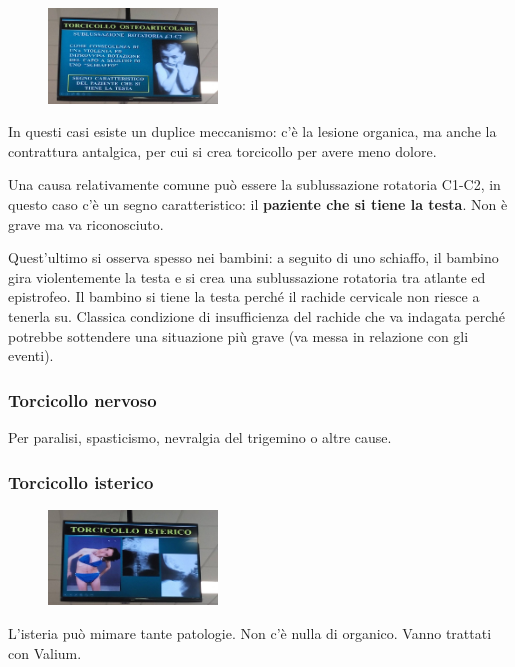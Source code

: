 \begin{figure}[!ht]
\centering
\includegraphics[width=0.4\textwidth]{013/image32.jpeg}
\end{figure}

In questi casi esiste un duplice meccanismo: c'è la lesione organica, ma anche la contrattura antalgica, per cui si crea torcicollo per avere meno dolore.

Una causa relativamente comune può essere la sublussazione rotatoria C1-C2, in questo caso c'è un segno caratteristico: il \textbf{paziente che si tiene la testa}. Non è grave ma va riconosciuto.

Quest'ultimo si osserva spesso nei bambini: a seguito di uno schiaffo, il bambino gira violentemente la testa e si crea una sublussazione rotatoria tra atlante ed epistrofeo. Il bambino si tiene la testa perché il rachide cervicale non riesce a tenerla su. Classica condizione di insufficienza del rachide che va indagata perché potrebbe sottendere una situazione più grave (va messa in relazione con gli eventi).

\subsubsection{Torcicollo nervoso}

Per paralisi, spasticismo, nevralgia del trigemino o altre cause.

\subsubsection{Torcicollo isterico}

\begin{figure}[!ht]
\centering
\includegraphics[width=0.4\textwidth]{013/image33.jpeg}
\end{figure}

L'isteria può mimare tante patologie. Non c'è nulla di organico. Vanno trattati con Valium.

